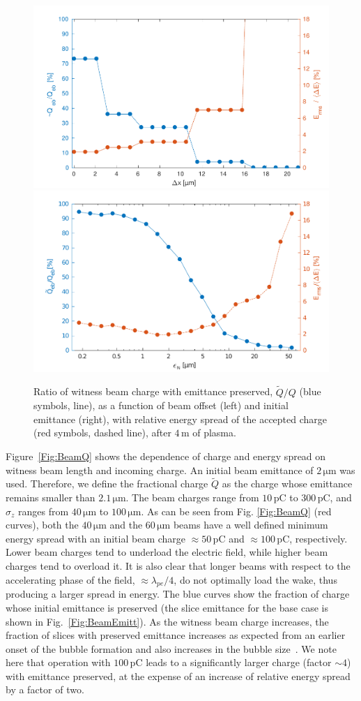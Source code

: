 \documentclass[aps,prstab,reprint,amsmath,amssymb,groupedaddress]{revtex4-1}
\newcommand{\unit}[1]{\,\mathrm{#1}}
\begin{document}
\begin{figure}[hbt]
    \includegraphics[width=0.49\linewidth,trim={2mm 0mm 2mm 0mm},clip]{figures/beamQualityOffset}
    \includegraphics[width=0.49\linewidth,trim={2mm 0mm 2mm 0mm},clip]{figures/beamQualityEmittance}
    \caption{\label{Fig:BeamQEmit} Ratio of witness beam charge with emittance preserved, $\widetilde{Q}/Q$
        (blue symbols, line), as a function of beam offset (left) and initial emittance (right), with relative energy
        spread of the accepted charge (red symbols, dashed line), after $4\unit{m}$ of plasma.}
\end{figure}

Figure~\ref{Fig:BeamQ} shows the dependence of charge and energy spread on witness beam length and incoming charge. An
initial beam emittance of $2\unit{\mu m}$ was used. Therefore, we define the fractional charge $\widetilde{Q}$ as the
charge whose emittance remains smaller than $2.1\unit{\mu m}$. The beam charges range from $10\unit{pC}$ to
$300\unit{pC}$, and $\sigma_{z}$ ranges from $40\unit{\mu m}$ to $100\unit{\mu m}$. As can be seen from Fig.
\ref{Fig:BeamQ} (red curves), both the $40\unit{\mu m}$ and the $60\unit{\mu m}$ beams have a well defined minimum
energy spread with an initial beam charge $\approx 50\unit{pC}$ and $\approx 100\unit{pC}$, respectively. Lower beam
charges tend to underload the electric field, while higher beam charges tend to overload it. It is also clear that
longer beams with respect to the accelerating phase of the field, $\approx\lambda_{pe}/4$, do not optimally load the
wake, thus producing a larger spread in energy. The blue curves show the fraction of charge whose initial emittance is
preserved (the slice emittance for the base case is shown in Fig.~\ref{Fig:BeamEmitt}). As the witness beam charge
increases, the fraction of slices with preserved emittance increases \textendash as expected from an earlier onset of
the bubble formation \textendash and also increases in the bubble size~\cite{lu:2006-1, lu:2006}. We note here that
operation with $100\unit{pC}$ leads to a significantly larger charge (factor $\sim 4$) with emittance preserved, at the
expense of an increase of relative energy spread by a factor of two.
\end{document}
